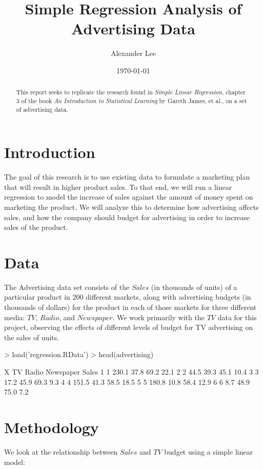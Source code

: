\documentclass{report}
\title{Simple Regression Analysis of Advertising Data}
\author{Alexander Lee}
\date{\today}
\begin{document}

\maketitle

\begin{abstract}
This report seeks to replicate the research found in \emph{Simple Linear Regression}, chapter 3 of the book \emph{An Introduction to Statistical Learning} by Gareth James, et al., on a set of advertising data.
\end{abstract}

\section*{Introduction}
The goal of this research is to use existing data to formulate a marketing plan that will result in higher product sales. To that end, we will run a linear regression to model the increase of sales against the amount of money spent on marketing the product. We will analyze this to determine how advertising affects sales, and how the company should budget for advertising in order to increase sales of the product.

\section*{Data}
The Advertising data set consists of the $Sales$ (in thousands of units) of a particular product in 200 different markets, along with advertising budgets (in thousands of dollars) for the product in each of those markets for three different media: $TV$, $Radio$, and $Newspaper$. We work primarily with the $TV$ data for this project, observing the effects of different levels of budget for TV advertising on the sales of units.

\begin{Schunk}
\begin{Sinput}
> load('regression.RData')
> head(advertising)
\end{Sinput}
\begin{Soutput}
  X    TV Radio Newspaper Sales
1 1 230.1  37.8      69.2  22.1
2 2  44.5  39.3      45.1  10.4
3 3  17.2  45.9      69.3   9.3
4 4 151.5  41.3      58.5  18.5
5 5 180.8  10.8      58.4  12.9
6 6   8.7  48.9      75.0   7.2
\end{Soutput}
\end{Schunk}

\section*{Methodology}
We look at the relationship between $Sales$ and $TV$ budget using a simple linear model:
\end{document}
